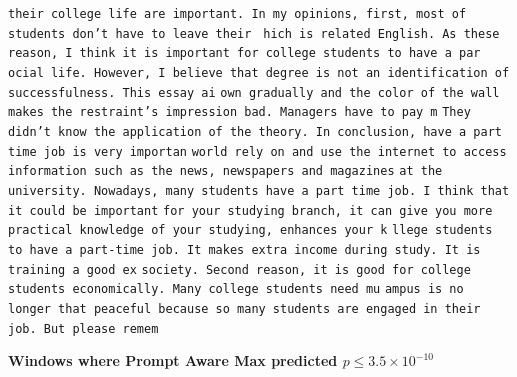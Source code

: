 \documentclass{article} %
\begin{document}
\texttt{\fontsize{.28cm}{.1cm}\selectfont \frenchspacing their college life are important. In my opinions, first, most of students don't have to leave their }
\texttt{\fontsize{.28cm}{.1cm}\selectfont \frenchspacing hich is related English. As these reason, I think it is important for college students to have a par}
\texttt{\fontsize{.28cm}{.1cm}\selectfont \frenchspacing ocial life. However, I believe that degree is not an identification of successfulness. This essay ai}
\texttt{\fontsize{.28cm}{.1cm}\selectfont \frenchspacing own gradually and the color of the wall makes the restraint's impression bad. Managers have to pay m}
\texttt{\fontsize{.28cm}{.1cm}\selectfont \frenchspacing They didn't know the application of the theory. In conclusion, have a part time job is very importan}
\texttt{\fontsize{.28cm}{.1cm}\selectfont \frenchspacing  world rely on and use the internet to access information such as the news, newspapers and magazines}
\texttt{\fontsize{.28cm}{.1cm}\selectfont \frenchspacing  at the university. Nowadays, many students have a part time job. I think that it could be important}
\texttt{\fontsize{.28cm}{.1cm}\selectfont \frenchspacing for your studying branch, it can give you more practical knowledge of your studying, enhances your k}
\texttt{\fontsize{.28cm}{.1cm}\selectfont \frenchspacing llege students to have a part-time job. It makes extra income during study. It is training a good ex}
\texttt{\fontsize{.28cm}{.1cm}\selectfont \frenchspacing  society. Second reason, it is good for college students economically. Many college students need mu}
\texttt{\fontsize{.28cm}{.1cm}\selectfont \frenchspacing ampus is no longer that peaceful because so many students are engaged in their job. But please remem}


\textbf{Windows where Prompt Aware Max predicted $p \le 3.5 \times 10^{-10}$}
\end{document}
